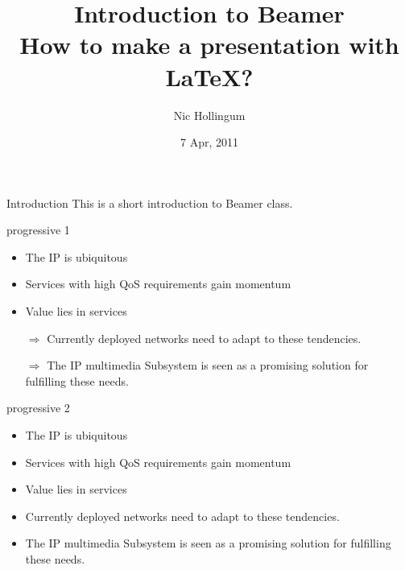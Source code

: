 \documentclass{beamer}
\title[Make a LaTeX presentation using Beamer]{Introduction  to Beamer\\How to make a presentation with LaTeX?}
\author{Nic Hollingum}
\institute{USYD}
\date{7 Apr, 2011}
\begin{document}
\begin{frame}
\titlepage
\end{frame}


\begin{frame}{Introduction}
This is a short introduction to Beamer class.
\end{frame}

\begin{frame}{progressive 1}
\begin{itemize}
    \item The IP is ubiquitous
    \item Services with high QoS requirements   gain momentum
    \item Value lies in services
    \pause
    \item[$\Rightarrow$] Currently deployed networks need to adapt to these tendencies.
 \item[$\Rightarrow$] The IP multimedia Subsystem is seen as a promising solution for fulfilling these needs.
\end{itemize}
\end{frame}

\begin{frame}{progressive 2}
\begin{itemize}
	\item<+-> The IP is ubiquitous
	\item<+-> Services with high QoS requirements   gain momentum
	\item<+-> Value lies in services
	\item<+->[$\Rightarrow$] Currently deployed networks need to adapt to these tendencies.
	\item<+->[$\Rightarrow$] The IP multimedia Subsystem is seen as a promising solution for fulfilling these needs.
\end{itemize}
\end{frame}
\end{document}
